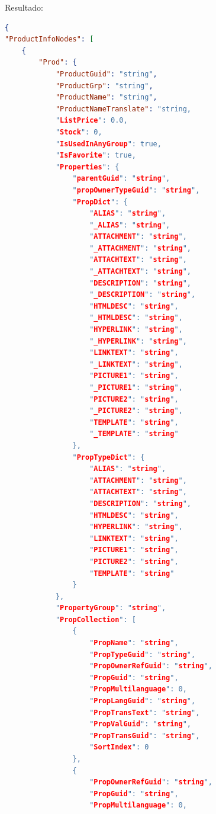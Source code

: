 Resultado:
\begin{lstlisting}[language=json]
{
"ProductInfoNodes": [
    {
        "Prod": {
            "ProductGuid": "string",
            "ProductGrp": "string",
            "ProductName": "string",
            "ProductNameTranslate": "string,
            "ListPrice": 0.0,
            "Stock": 0,
            "IsUsedInAnyGroup": true,
            "IsFavorite": true,
            "Properties": {
                "parentGuid": "string",
                "propOwnerTypeGuid": "string",
                "PropDict": {
                    "ALIAS": "string",
                    "_ALIAS": "string",
                    "ATTACHMENT": "string",
                    "_ATTACHMENT": "string",
                    "ATTACHTEXT": "string",
                    "_ATTACHTEXT": "string",
                    "DESCRIPTION": "string",
                    "_DESCRIPTION": "string",
                    "HTMLDESC": "string",
                    "_HTMLDESC": "string",
                    "HYPERLINK": "string",
                    "_HYPERLINK": "string",
                    "LINKTEXT": "string",
                    "_LINKTEXT": "string",
                    "PICTURE1": "string",
                    "_PICTURE1": "string",
                    "PICTURE2": "string",
                    "_PICTURE2": "string",
                    "TEMPLATE": "string",
                    "_TEMPLATE": "string"
                },
                "PropTypeDict": {
                    "ALIAS": "string",
                    "ATTACHMENT": "string",
                    "ATTACHTEXT": "string",
                    "DESCRIPTION": "string",
                    "HTMLDESC": "string",
                    "HYPERLINK": "string",
                    "LINKTEXT": "string",
                    "PICTURE1": "string",
                    "PICTURE2": "string",
                    "TEMPLATE": "string"
                }
            },
            "PropertyGroup": "string",
            "PropCollection": [
                {
                    "PropName": "string",
                    "PropTypeGuid": "string",
                    "PropOwnerRefGuid": "string",
                    "PropGuid": "string",
                    "PropMultilanguage": 0,
                    "PropLangGuid": "string",
                    "PropTransText": "string",
                    "PropValGuid": "string",
                    "PropTransGuid": "string",
                    "SortIndex": 0
                },
                {
                    "PropOwnerRefGuid": "string",
                    "PropGuid": "string",
                    "PropMultilanguage": 0,

\end{lstlisting}
